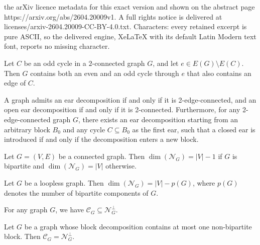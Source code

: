 \documentclass[10pt,a4paper]{amsart}
\newcommand{\cC}{\mathcal{C}}
\newcommand{\cN}{\mathcal{N}}
\begin{document}
the arXiv licence metadata for this exact version and shown on the abstract page https://arxiv.org/abs/2604.20009v1. A full rights notice is delivered at licenses/arxiv-2604.20009-CC-BY-4.0.txt. Characters: every retained excerpt is pure ASCII, so the delivered engine, XeLaTeX with its default Latin Modern text font, reports no missing character.
\begin{thm}\label{thm:even_odd}
    Let $C$ be an odd cycle in a $2$-connected graph $G$, and let $e \in E(G) \setminus E(C)$. Then $G$ contains both an even and an odd cycle through $e$ that also contains an edge of $C$.
\end{thm}

\begin{thm}\label{thm:whitney}
   A graph admits an ear decomposition if and only if it is 2-edge-connected, and an open ear decomposition if and only if it is 2-connected. Furthermore, for any 2-edge-connected graph $G$, there exists an ear decomposition starting from an arbitrary block $B_0$ and any cycle $C\subseteq B_0$ as the first ear, such that a closed ear is introduced if and only if the decomposition enters a new block.
\end{thm}

\begin{lem}\label{lem:space}
    Let $G = (V, E)$ be a connected graph. Then $\dim(\mathcal{N}_G) = |V| - 1$ if $G$ is bipartite and $\dim(\mathcal{N}_G) = |V|$ otherwise.
\end{lem}

\begin{cor}\label{cor:jgnofg}
Let $G$ be a loopless graph. Then $\dim(\cN_G) = |V| - p(G)$, where $p(G)$ denotes the number of bipartite components of $G$.
\end{cor}

\begin{lem}\label{lem:C_subset_of_N_perp}
    For any graph $G$, we have $\cC_G \subseteq \cN_G^{\perp}$.
\end{lem}

\begin{thm}\label{thm:ear_decomposition_main}
    Let $G$ be a graph whose block decomposition contains at most one non-bipartite block. Then $\cC_G = \cN_G^{\perp}$.
\end{thm}
\end{document}
